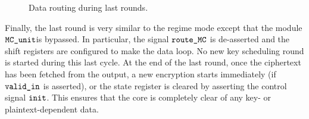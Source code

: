\documentclass{scrartcl}
\begin{document}
\begin{figure}
    \centering
     
    \caption{Data routing during last rounds.}
    \label{fig:time_last_round}
\end{figure}


Finally, the last round is very similar to the regime mode except that the
module $\texttt{MC\_unit}$is bypassed. In particular, the signal
$\texttt{route\_MC}$ is de-asserted and the shift registers are configured to
make the data loop. No new key scheduling round is started during this last
cycle.
At the end of the last round, once the ciphertext has been fetched from the
output, a new encryption starts immediately (if $\texttt{valid\_in}$ is asserted),
or the state register is cleared by asserting the control signal
$\texttt{init}$. This ensures that the core is completely clear of any
key- or plaintext-dependent data.
\end{document}
